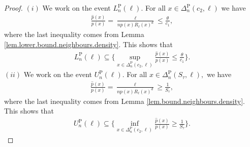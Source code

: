 \documentclass[10pt]{article}
\renewcommand{\P}{\operatorname{P}}
\newcommand{\wh}{\widehat}
\begin{document}
\begin{proof}
    $(i)$ We work on the event $L_n^{\P}(\ell).$ For all $x \in \Delta_n^{\P}(c_2, \ell)$ we have
    \begin{align*}
        \frac{\wh p(x)}{p(x)} = \frac{\ell}{np(x)R_{\ell}(x)^d} \leq \frac{\theta}{c_1},
    \end{align*}
    where the last inequality comes from Lemma \ref{lem.lower.bound.neighbours.density}. This shows that 
    \begin{align*}
        L_n^{\P}(\ell) \subseteq \Bigg\{\sup_{x \in \Delta_n^{\P}(c_2, \ell)} \frac{\wh p(x)}{p(x)} \leq \frac{\theta}{c_1}\Bigg\}.
    \end{align*}
    $(ii)$ We work on the event $U_n^{\P}(\ell).$ For all $x \in \Delta_n^{\P}(S_\tau, \ell),$ we have
    \begin{align*}
        \frac{\wh p(x)}{p(x)} = \frac{\ell}{np(x)R_\ell(x)^d} \geq \frac{1}{S_\tau},
    \end{align*}
    where the last inequality comes from Lemma \ref{lem.bound.neighbours.density}. This shows that 
    \begin{align*}
        U_n^{\P}(\ell) \subseteq \Bigg\{\inf_{x \in \Delta_n^{\P}(c_2, \ell)} \frac{\wh p(x)}{p(x)} \geq \frac{1}{S_\tau}\Bigg\}.
    \end{align*}
\end{proof}
\end{document}
